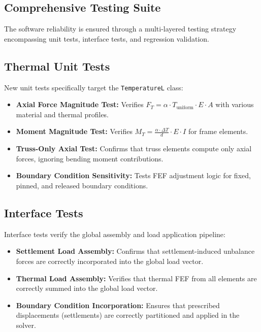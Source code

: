 \documentclass[12pt,a4paper]{article}
\begin{document}
\subsection{Comprehensive Testing Suite}

The software reliability is ensured through a multi-layered testing strategy encompassing unit tests, interface tests, and regression validation.

\subsection{Thermal Unit Tests}

New unit tests specifically target the \texttt{TemperatureL} class:

\begin{itemize}
    \item \textbf{Axial Force Magnitude Test:} Verifies $F_T = \alpha \cdot T_{\text{uniform}} \cdot E \cdot A$ with various material and thermal profiles.
    \item \textbf{Moment Magnitude Test:} Verifies $M_T = \frac{\alpha \cdot \Delta T}{d} \cdot E \cdot I$ for frame elements.
    \item \textbf{Truss-Only Axial Test:} Confirms that truss elements compute only axial forces, ignoring bending moment contributions.
    \item \textbf{Boundary Condition Sensitivity:} Tests FEF adjustment logic for fixed, pinned, and released boundary conditions.
\end{itemize}

\subsection{Interface Tests}

Interface tests verify the global assembly and load application pipeline:

\begin{itemize}
    \item \textbf{Settlement Load Assembly:} Confirms that settlement-induced unbalance forces are correctly incorporated into the global load vector.
    \item \textbf{Thermal Load Assembly:} Verifies that thermal FEF from all elements are correctly summed into the global load vector.
    \item \textbf{Boundary Condition Incorporation:} Ensures that prescribed displacements (settlements) are correctly partitioned and applied in the solver.
\end{itemize}
\end{document}
